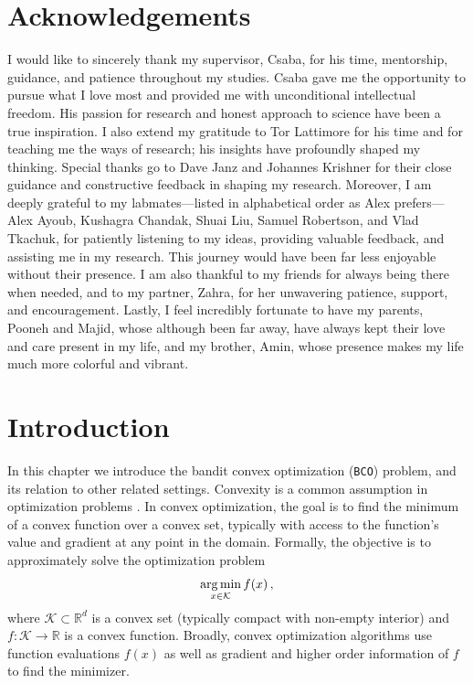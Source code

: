\documentclass[letter, 12pt]{report}
\newcommand{\argmin}{\operatornamewithlimits{arg\,min}}
\newcommand{\cK}{\mathcal K}
\newcommand{\1}{\mathbf{1}}
\newcommand{\bco}{\texttt{BCO}\xspace}
\theoremstyle{plain}
\theoremstyle{definition}
\theoremstyle{remark}
\begin{document}
\chapter*{Acknowledgements} 
I would like to sincerely thank my supervisor, Csaba,
for his time, mentorship, guidance, and patience throughout my studies.
Csaba gave me the opportunity to pursue what I love most and provided me with unconditional intellectual freedom.
His passion for research and honest approach to science have been a true inspiration.
I also extend my gratitude to Tor Lattimore for his time and for teaching me the ways of research; his insights have profoundly shaped my thinking.
Special thanks go to Dave Janz and Johannes Krishner for their close guidance and constructive feedback in shaping my research.
Moreover, I am deeply grateful to my labmates—listed
in alphabetical order as Alex prefers—Alex Ayoub, Kushagra Chandak,
Shuai Liu, Samuel Robertson, and Vlad Tkachuk, for patiently
listening to my ideas, providing valuable feedback,
and assisting me in my research.
This journey would have been far less enjoyable without
their presence.
I am also thankful to my friends for always being there when
needed, and to my partner, Zahra, for her unwavering patience,
support, and encouragement.
Lastly, I feel incredibly fortunate to have my parents, Pooneh and Majid, whose although been far away, have always kept their love and care present in my life, and my brother, Amin, whose presence makes my life much more colorful and vibrant.

\tableofcontents
\listoftables
\listoffigures
\listofalgorithms {}

\clearpage
\setcounter{page}{1}   %
\renewcommand{\thepage}{\arabic{page}} %

\chapter{Introduction} \label{ch:intro}
In this chapter we introduce the bandit convex optimization (\bco) problem, and its relation to other related settings.
Convexity is a common assumption in optimization problems \citep{boyd2004convex}.
In convex optimization, the goal is to find the minimum of a convex function over a convex set, typically with access to the function's value and gradient at any point in the domain.
Formally, the objective is to approximately solve the optimization problem
\begin{align}
    \argmin_{x \in \cK} f(x)\,,
\end{align}
where \( \cK \subset \mathbb{R}^d \) is a convex set (typically compact with non-empty interior) and \( f : \cK \to \mathbb{R} \) is a convex function.
Broadly, convex optimization algorithms use function evaluations $f(x)$ as well as gradient and higher order information of $f$ to find the minimizer.
\end{document}
